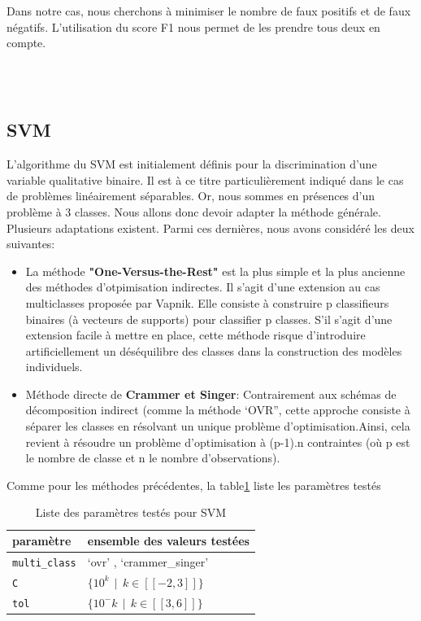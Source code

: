 \documentclass[a4paper]{report}
\begin{document}
\medskip
Dans notre cas, nous cherchons à minimiser le nombre de faux positifs et de faux négatifs. L’utilisation du score F1 nous permet de les prendre tous deux en compte.  



\\
\\
\subsection{SVM}
L’algorithme du SVM est initialement définis pour la discrimination d’une variable qualitative binaire. Il est à ce titre particulièrement indiqué dans le cas de problèmes linéairement séparables. Or, nous sommes en présences d’un problème à 3 classes. Nous allons donc devoir adapter la méthode générale. Plusieurs adaptations existent. Parmi ces dernières, nous avons considéré les deux suivantes:

\begin{itemize}

\item La méthode \textbf{"One-Versus-the-Rest"} est la plus simple et la plus ancienne des méthodes d'otpimisation indirectes. Il s'agit d'une extension au cas multiclasses proposée par Vapnik\cite{Vapnik}. Elle consiste à construire p classifieurs binaires (à vecteurs de supports) pour classifier p classes. S’il s’agit d’une extension facile à mettre en place, cette méthode risque d’introduire artificiellement un déséquilibre des classes dans la construction des modèles individuels. \\


\medskip
\item Méthode directe de \textbf{Crammer et Singer}\cite{Crammer}: Contrairement aux schémas de décomposition indirect (comme la méthode ‘OVR”, cette approche consiste à séparer les classes en résolvant un unique problème d’optimisation.Ainsi, cela revient à résoudre un problème d’optimisation à (p-1).n contraintes (où p est le nombre de classe et n le nombre d’observations).
\end{itemize}

\bigskip
Comme pour les méthodes précédentes, la table\ref{params_svm} liste les paramètres testés

\begin{table}[h]
\centering
\begin{tabular}{ll}
paramètre & ensemble des valeurs testées \\
\hline

\texttt{multi\_class} & ‘ovr’ , ‘crammer\_singer’ \\
\texttt{C} & $\{10^k \>\> | \>\> k \in [\![-2, 3]\!] \}$ \\
\texttt{tol} & $\{10^-k \>\> | \>\> k \in [\![3, 6]\!] \}$ \\
\end{tabular}

\caption{Liste des paramètres testés pour SVM\label{params_svm}}
\end{table}
\end{document}
